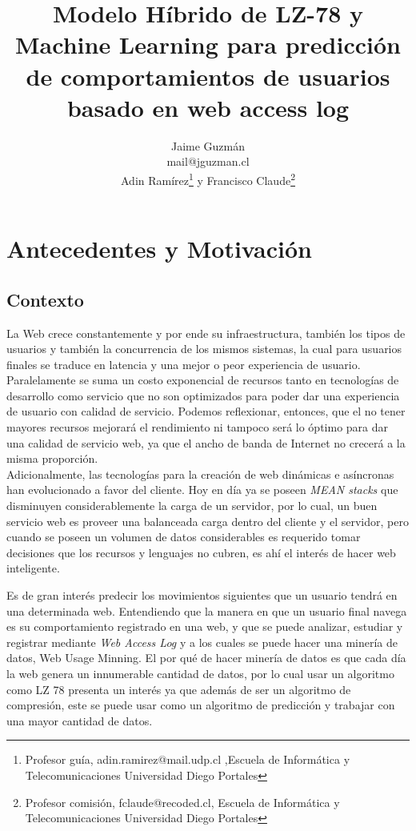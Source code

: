 \documentclass{udparticle}
\title{ Modelo Híbrido de LZ-78 y Machine Learning para predicción de comportamientos de usuarios basado en web access log }
\author{  
  Jaime Guzmán\\{\small\ttfamily mail@jguzman.cl}\protect\\[5pt]%
  {\small Adin Ramírez\thanks{Profesor guía, adin.ramirez@mail.udp.cl ,Escuela de Informática y Telecomunicaciones Universidad Diego Portales   } y Francisco Claude\thanks{Profesor comisión, fclaude@recoded.cl, Escuela de Informática y Telecomunicaciones Universidad Diego Portales  }}%
  }
\begin{document}
\maketitle

\section{Antecedentes y Motivación}

\subsection{Contexto}

  La Web crece constantemente y por ende su infraestructura, también los tipos de usuarios y  también la concurrencia de los mismos sistemas, la cual para usuarios finales se traduce en latencia y una mejor o peor experiencia de usuario. 
  Paralelamente se suma un costo exponencial de recursos tanto en tecnologías de desarrollo como servicio que no son optimizados para poder dar una experiencia de usuario con calidad de servicio. Podemos reflexionar, entonces, que el no tener mayores recursos mejorará el rendimiento ni tampoco será lo óptimo para dar una calidad de servicio web, ya que el ancho de banda de Internet no crecerá a la misma proporción.\\
  
   
  Adicionalmente, las tecnologías para la creación de web dinámicas e asíncronas han evolucionado a favor del cliente.
  Hoy en día ya se poseen \emph{MEAN stacks} que disminuyen considerablemente la carga de un servidor, por lo cual, un buen servicio web es proveer una balanceada carga dentro del cliente y el servidor, pero cuando se poseen un volumen de datos considerables es requerido tomar decisiones que los recursos y lenguajes no cubren, es ahí el interés de hacer  web inteligente.

  Es de gran interés predecir los movimientos siguientes que un usuario tendrá en una determinada web.
  Entendiendo que la manera en que un usuario final navega es su comportamiento registrado en una web, y que se puede analizar, estudiar y registrar mediante \emph{Web Access Log} y a los cuales se puede hacer una minería de datos, Web Usage Minning. El por qué de hacer minería de datos es que cada día la web genera un innumerable cantidad de datos, por lo cual usar un algoritmo como LZ 78 presenta un interés ya que además de ser un algoritmo de compresión, este se puede usar como un algoritmo de predicción y trabajar con una mayor cantidad de datos.
  
\end{document}
